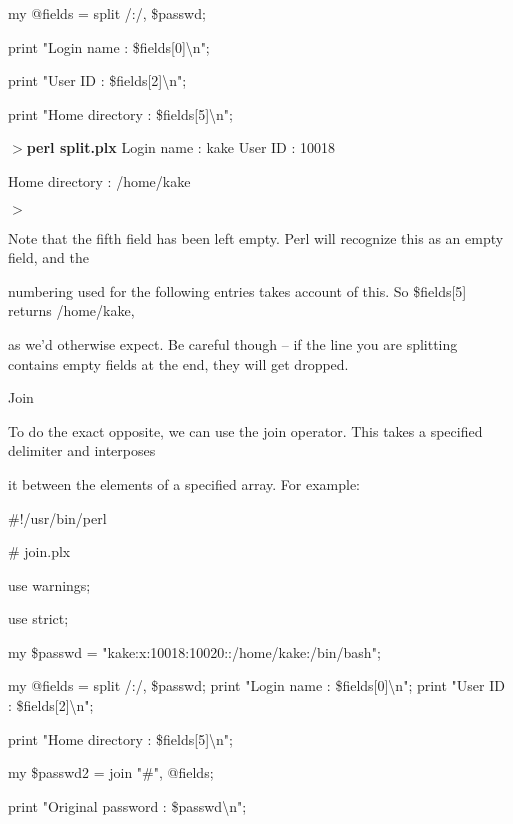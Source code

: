 \documentclass[a4paper,11pt]{book}
\begin{document}
\noindent my @fields = split /:/, \$passwd;

\noindent print "Login name : \$fields[0]\textbackslash n";

\noindent print "User ID : \$fields[2]\textbackslash n";

\noindent print "Home directory : \$fields[5]\textbackslash n";

\noindent 

\noindent $>$\textbf{perl split.plx }Login name : kake User ID : 10018

\noindent Home directory : /home/kake

\noindent $>$

\noindent 

\noindent Note that the fifth field has been left empty. Perl will recognize this as an empty field, and the

\noindent numbering used for the following entries takes account of this. So \$fields[5] returns /home/kake,

\noindent as we'd otherwise expect. Be careful though -- if the line you are splitting contains empty fields at the end, they will get dropped.

\noindent 

\noindent Join

\noindent 

\noindent To do the exact opposite, we can use the join operator. This takes a specified delimiter and interposes

\noindent it between the elements of a specified array. For example:

\noindent 

\noindent 

\noindent \#!/usr/bin/perl

\noindent \# join.plx

\noindent use warnings;

\noindent use strict;

\noindent 

\noindent my \$passwd = "kake:x:10018:10020::/home/kake:/bin/bash";

\noindent my @fields = split /:/, \$passwd; print "Login name : \$fields[0]\textbackslash n"; print "User ID : \$fields[2]\textbackslash n";

\noindent print "Home directory : \$fields[5]\textbackslash n";

\noindent 

\noindent my \$passwd2 = join "\#", @fields;

\noindent print "Original password : \$passwd\textbackslash n";
\end{document}
